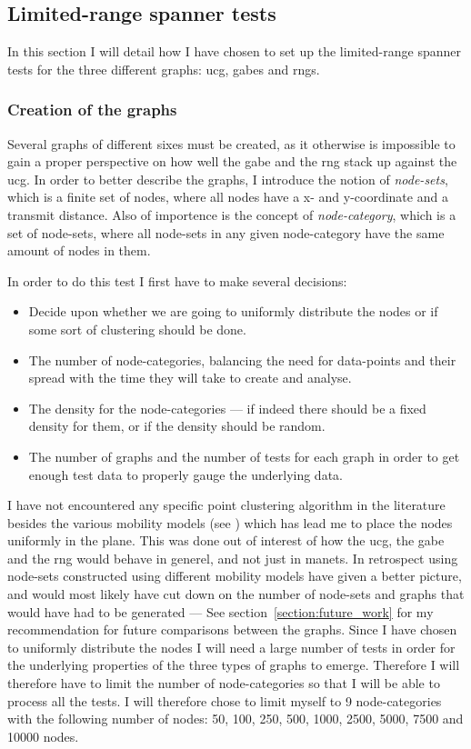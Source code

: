 \subsection{Limited-range spanner tests}
\label{section:test_desc_spanners}
In this section I will detail how I have chosen to set up the limited-range spanner tests for the three different graphs: \ac{ucg}, \acp{gabe} and \acp{rng}.

\subsubsection{Creation of the graphs}
Several graphs of different sixes must be created, as it otherwise is impossible to gain a proper perspective on how well the \ac{gabe} and the \ac{rng} stack up against the \ac{ucg}. In order to better describe the graphs, I introduce the notion of \emph{node-sets}, which is a finite set of nodes, where all nodes have a x- and y-coordinate and a transmit distance. Also of importence is the concept of \emph{node-category}, which is a set of node-sets, where all node-sets in any given node-category have the same amount of nodes in them. 

In order to do this test I first have to make several decisions:
\begin{itemize}
\item Decide upon whether we are going to uniformly distribute the nodes or if some sort of clustering should be done. 
\item The number of node-categories, balancing the need for data-points and their spread with the time they will take to create and analyse.
\item The density for the node-categories --- if indeed there should be a fixed density for them, or if the density should be random.
\item The number of graphs and the number of tests for each graph in order to get enough test data to properly gauge the underlying data.
\end{itemize}

I have not encountered any specific point clustering algorithm in the literature besides the various mobility models (see \cite{disasterArea, MobilityAdHocResearch}) which has lead me to place the nodes uniformly in the plane. This was done out of interest of how the \ac{ucg}, the \ac{gabe} and the \ac{rng} would behave in generel, and not just in \acp{manet}. In retrospect using node-sets constructed using different  mobility models have given a better picture, and would most likely have cut down on the number of node-sets and graphs that would have had to be generated --- See section~\ref{section:future_work} for my recommendation for future comparisons between the graphs.   
Since I have chosen to uniformly distribute the nodes I will need a large number of tests in order for the underlying properties of the three types of graphs to emerge. Therefore I will therefore have to limit the number of node-categories so that I will be able to process all the tests. I will therefore chose to limit myself to 9 node-categories with the following number of nodes: 50, 100, 250, 500, 1000, 2500, 5000, 7500 and 10000 nodes.

